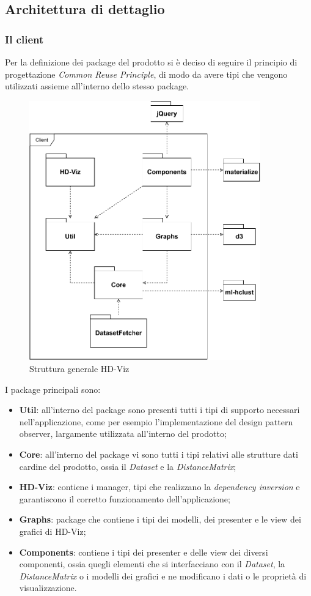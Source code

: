 \documentclass[../manuale_sviluppatore.tex]{subfiles}
\begin{document}
\subsection{Architettura di dettaglio}
\subsubsection{Il client}

Per la definizione dei package del prodotto si è deciso di seguire il principio di progettazione 
\emph{Common Reuse Principle}, di modo da avere tipi che vengono utilizzati assieme all'interno 
dello stesso package.

\begin{figure}[H]
	\centering
	\includegraphics[width=10cm]{src/img/packageDiagramOverview.pdf}
	\caption{Struttura generale HD-Viz}
\end{figure}

I package principali sono:
\begin{itemize}
	\item \textbf{Util}: all'interno del package sono presenti tutti i tipi di supporto necessari 
	nell'applicazione, come per esempio l'implementazione del design pattern observer, largamente 
	utilizzata all'interno del prodotto;
	\item \textbf{Core}: all'interno del package vi sono tutti i tipi relativi alle strutture dati 
	cardine del prodotto, ossia il \emph{Dataset} e la \emph{DistanceMatrix};
	\item \textbf{HD-Viz}: contiene i manager, tipi che realizzano la \emph{dependency inversion} e 
	garantiscono il corretto funzionamento dell'applicazione;
	\item \textbf{Graphs}: package che contiene i tipi dei modelli, dei presenter e le view dei 
	grafici di HD-Viz;
	\item \textbf{Components}: contiene i tipi dei presenter e delle view dei diversi componenti, 
	ossia quegli elementi che si interfacciano con il \emph{Dataset}, la \emph{DistanceMatrix} o i 
	modelli dei grafici e ne modificano i dati o le proprietà di visualizzazione.
\end{itemize}
\end{document}
